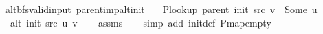 \begin{isabellebody}
{}
\isamarkuptrue%
%
\endisatagdocument
{\isafolddocument}%
%
\isadelimdocument
%
\endisadelimdocument
{}\isamarkupfalse%
\ {\isacharparenleft}{\kern0pt}\ alt{\isacharunderscore}{\kern0pt}bfs{\isacharunderscore}{\kern0pt}valid{\isacharunderscore}{\kern0pt}input{\isacharparenright}{\kern0pt}\ parent{\isacharunderscore}{\kern0pt}imp{\isacharunderscore}{\kern0pt}alt{\isacharunderscore}{\kern0pt}init{\isacharcolon}{\kern0pt}\isanewline
\ \ \ {\isachardoublequoteopen}P{\isacharunderscore}{\kern0pt}lookup\ {\isacharparenleft}{\kern0pt}parent\ {\isacharparenleft}{\kern0pt}init\ src{\isacharparenright}{\kern0pt}{\isacharparenright}{\kern0pt}\ v\ {\isacharequal}{\kern0pt}\ Some\ u{\isachardoublequoteclose}\isanewline
\ \ \ {\isachardoublequoteopen}alt\ {\isacharparenleft}{\kern0pt}init\ src{\isacharparenright}{\kern0pt}\ u\ v{\isachardoublequoteclose}\isanewline
%
\isadelimproof
\ \ %
\endisadelimproof
%
\isatagproof
{}\isamarkupfalse%
\ assms\isanewline
\ \ \isamarkupfalse%
\ {\isacharparenleft}{\kern0pt}simp\ add{\isacharcolon}{\kern0pt}\ init{\isacharunderscore}{\kern0pt}def\ P{\isachardot}{\kern0pt}map{\isacharunderscore}{\kern0pt}empty{\isacharparenright}{\kern0pt}%
\endisatagproof
{\isafoldproof}%
%
\isadelimproof
%
\endisadelimproof
%
\isadelimdocument
%
\endisadelimdocument
%
\isatagdocument
%

\end{isabellebody}
